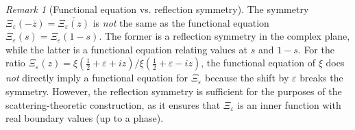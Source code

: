 ﻿\documentclass[12pt,a4paper]{article}
\theoremstyle{definition}
\theoremstyle{remark}
\newtheorem{remark}[theorem]{Remark}
\begin{document}
\begin{remark}[Functional equation vs. reflection symmetry]
\label{rem:functional-vs-reflection}
The symmetry $\Xi_\varepsilon(-\overline{z}) = \overline{\Xi_\varepsilon(z)}$ is \emph{not} the same as the functional equation $\Xi_\varepsilon(s) = \Xi_\varepsilon(1-s)$. The former is a reflection symmetry in the complex plane, while the latter is a functional equation relating values at $s$ and $1-s$. For the ratio $\Xi_\varepsilon(z) = \xi(\tfrac12+\varepsilon+iz)/\xi(\tfrac12+\varepsilon-iz)$, the functional equation of $\xi$ does \emph{not} directly imply a functional equation for $\Xi_\varepsilon$ because the shift by $\varepsilon$ breaks the symmetry. However, the reflection symmetry is sufficient for the purposes of the scattering-theoretic construction, as it ensures that $\Xi_\varepsilon$ is an inner function with real boundary values (up to a phase).
\end{remark}
\end{document}
